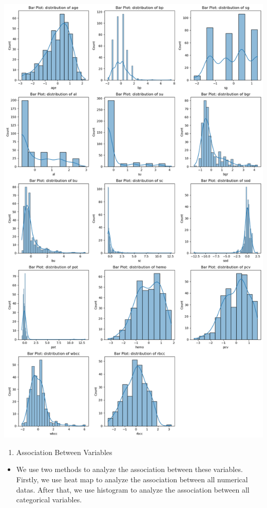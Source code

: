 \documentclass[
  11pt,
  letterpaper,
  DIV=11,
  numbers=noendperiod]{scrartcl}
\providecommand{\tightlist}{%
  \setlength{\itemsep}{0pt}\setlength{\parskip}{0pt}}\usepackage{longtable,booktabs,array}
\begin{document}
\includegraphics{assignment6111_files/figure-pdf/cell-17-output-1.png}

\begin{enumerate}
\def\labelenumi{\arabic{enumi}.}
\setcounter{enumi}{3}
\tightlist
\item
  Association Between Variables
\end{enumerate}

\begin{itemize}
\tightlist
\item
  We use two methods to analyze the association between these variables.
  Firstly, we use heat map to analyze the association between all
  numerical datas. After that, we use histogram to analyze the
  association between all categorical variables.
\end{itemize}
\end{document}
